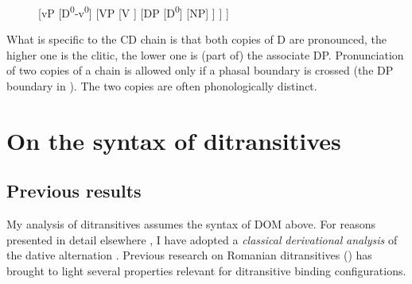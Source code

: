 \documentclass[output=paper,modfonts,nonflat,newtxmath]{langsci/langscibook}
\begin{document}
\begin{figure}%
	\begin{forest}
	[vP
		[D\textsuperscript{0}-v\textsuperscript{0}]
		[VP
			[V
			]
			[DP
				[D\textsuperscript{0}]
				[NP]
			]
		]
	]	
	\end{forest}
	\caption{\label{fig:cornilescu:6} \missingcaption}
\end{figure}

What is specific to the CD chain is that both copies of D are pronounced, the higher one is the clitic, the lower one is (part of) the associate DP. Pronunciation of two copies of a chain is allowed only if a phasal boundary is crossed (the DP boundary in ). The two copies are often phonologically distinct. 

\section{On the syntax of ditransitives} %

\subsection{{Previous} {results}}%

My analysis of ditransitives assumes the syntax of DOM above. For reasons presented in detail elsewhere \citep{CornilescuDinuTigău2017DOC}, I have adopted a \textit{classical} \textit{derivational} \textit{analysis} of the dative alternation \citep{HaradaLarson2009, OrmazabalRomero2017}. Previous research on Romanian ditransitives (\citealt{DiaconescuRivero2007, CornilescuDinuTigău2017DOC}) has brought to light several properties relevant for ditransitive binding configurations.
\end{document}
